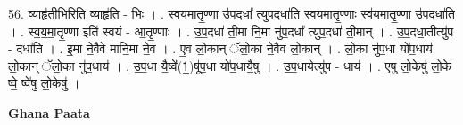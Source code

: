 \documentclass[17pt]{extarticle}
\begin{document}
56. व्याहृ॑तीभि॒रिति॒ व्याहृ॑ति - भिः॒ । . स्व॒य॒मा॒तृ॒ण्णा उ॑प॒दधा᳚ त्युप॒दधा॑ति स्वयमातृ॒ण्णाः स्व॑यमातृ॒ण्णा उ॑प॒दधा॑ति । . स्व॒य॒मा॒तृ॒ण्णा इति॑ स्वयं - आ॒तृ॒ण्णाः । . उ॒प॒दधा॑ ती॒मा नि॒मा नु॑प॒दधा᳚ त्युप॒दधा॑ ती॒मान् । . उ॒प॒दधा॒तीत्यु॑प - दधा॑ति । . इ॒मा ने॒वैवे मानि॒मा ने॒व । . ए॒व लो॒कान् ॅलो॒का ने॒वैव लो॒कान् । . लो॒का नु॑प॒धा यो॑प॒धाय॑ लो॒कान् ॅलो॒का नु॑प॒धाय॑ । . उ॒प॒धा यै॒ष्वे᳚(1॒)षू॑प॒धा यो॑प॒धायै॒षु । . उ॒प॒धायेत्यु॑प - धाय॑ । . ए॒षु लो॒केषु॑ लो॒के ष्वे॒ ष्वे॑षु लो॒केषु॑ । \newline

\textbf{Ghana Paata } \newline
\end{document}
